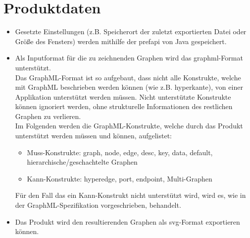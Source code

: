 \chapter{Produktdaten}\label{ch:daten}

\begin{itemize}
  \item Gesetzte Einstellungen (z.B. Speicherort der zuletzt exportierten Datei oder Größe des Fensters) werden mithilfe der \gls{prefapi} von Java gespeichert.
  \item Als Inputformat für die zu zeichnenden Graphen wird das \gls{graphml}-Format unterstützt.\\
    Das GraphML-Format\cite{Brandes2002} ist so aufgebaut, dass nicht alle Konstrukte, welche mit GraphML beschrieben werden können (wie z.B. \gls{hyperkante}),
    von einer Applikation unterstützt werden müssen.
    Nicht unterstützte Konstrukte können ignoriert werden, ohne strukturelle Informationen des restlichen Graphen zu verlieren.\\
    Im Folgenden werden die GraphML-Konstrukte, welche durch das Produkt unterstützt werden müssen und können, aufgelistet:
    \begin{itemize}
      \item Muss-Konstrukte: graph, node, edge, desc, key, data, default, hierarchische/geschachtelte Graphen  %
      \item Kann-Konstrukte: hyperedge, port, endpoint, Multi-Graphen
    \end{itemize}
    Für den Fall das ein Kann-Konstrukt nicht unterstützt wird, wird es, wie in der GraphML-Spezifikation\cite{GraphMLSpecs} vorgeschrieben, behandelt.
  \item Das Produkt wird den resultierenden Graphen als \gls{svg}-Format exportieren können.
\end{itemize}
